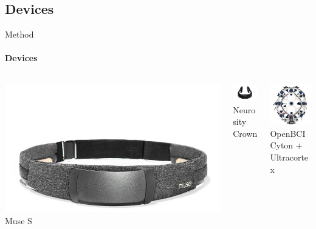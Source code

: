 \documentclass[xcolor={dvipsnames,table},12pt]{beamer}
\begin{document}
    \subsection{Devices}
\begin{frame}{Method}
    \framesubtitle{Devices}

    \begin{columns}
        \begin{column}{0.33\textwidth}
            \vspace{9mm}
            \centering
            \includegraphics[trim=0 -50 0 200,clip,width=\textwidth]{./img/Muse-S.jpg}
            \\ Muse S
        \end{column}

        \begin{column}{0.33\textwidth}
            \vspace{4mm}
            \centering
            \includegraphics[trim=200 150 200 100,clip,width=3cm]{./img/crown-1.png}
            \\ Neurosity Crown
        \end{column}

        \begin{column}{0.33\textwidth}
            \centering
            \includegraphics[width=3cm]{./img/openbci-cyton.jpg}
            \\ OpenBCI Cyton + Ultracortex
        \end{column}
    \end{columns}

    \vspace{-5mm}
    \begin{adjustbox}{width=\textwidth,center,float=table}
        
    \end{adjustbox}
\end{frame}
\end{document}
